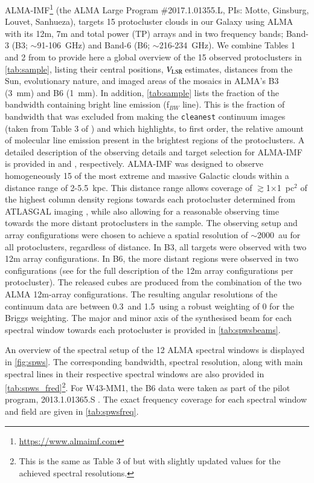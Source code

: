 \documentclass[longauth]{aa} %
\newcommand{\vlsr}{\mbox{$V_{\rm LSR}$\,}}
\begin{document}
\label{sec:observations}
ALMA-IMF\footnote{\url{https://www.almaimf.com}} (the ALMA Large Program \#2017.1.01355.L, PIs: Motte, Ginsburg, Louvet, Sanhueza), targets 15 protocluster clouds in our Galaxy using ALMA with its 12m, 7m and total power (TP) arrays and in two frequency bands; Band-3 (B3; $\sim$91-106~GHz) and Band-6 (B6; $\sim$216-234~GHz).
 We combine Tables 1 and 2 from \citet{Motte2022} to provide here a global overview of the 15 observed protoclusters in \cref{tab:sample}, listing their central positions, \vlsr estimates, distances from the Sun, evolutionary nature, and imaged areas of the mosaics in ALMA's B3 (3~mm) and B6 (1~mm). In addition, \cref{tab:sample} lists the fraction of the bandwidth containing bright line emission (f$_{BW}$ line). This is the fraction of bandwidth that was excluded from making the \texttt{cleanest} continuum images (taken from Table 3 of \citealt{Ginsburg2022}) and which highlights, to first order, the relative amount of molecular line emission present in the brightest regions of the protoclusters. A detailed description of the observing details and target selection for ALMA-IMF is provided in \citet{Ginsburg2022} and \citet{Motte2022}, respectively. ALMA-IMF was designed to observe homogeneously 15 of the most extreme and massive Galactic clouds within a distance range of 2-5.5~kpc. This distance range allows coverage of $\gtrsim$1$\times$1~pc$^2$ of the highest column density regions towards each protocluster determined from ATLASGAL imaging \citep{csengeri17b}, while also allowing for a reasonable observing time towards the more distant protoclusters in the sample. The observing setup and array configurations were chosen to achieve a spatial resolution of $\sim$2000~au for all protoclusters, regardless of distance. In B3, all targets were observed with two 12m array configurations. In B6, the more distant regions were observed in two configurations (see \citealt{Ginsburg2022} for the full description of the 12m array configurations per protocluster). The released cubes are produced from the combination of the two ALMA 12m-array configurations. The resulting angular resolutions of the continuum data are between 0.3\arcsec\, and 1.5\arcsec\, using a robust weighting of 0 for the Briggs weighting. The major and minor axis of the synthesised beam for each spectral window towards each protocluster is provided in \cref{tab:spwsbeams}.
  
An overview of the spectral setup of the 12 ALMA spectral windows is displayed in \cref{fig:spws}. The corresponding bandwidth, spectral resolution, along with main spectral lines in their respective spectral windows are also provided in \cref{tab:spws_fred}\footnote{This is the same as Table 3 of \citet{Motte2022} but with slightly updated values for the achieved spectral resolutions.\label{note:newres}}. For W43-MM1, the B6 data were taken as part of the pilot program, 2013.1.01365.S \citep{Motte2018}. The exact frequency coverage for each spectral window and field are given in \cref{tab:spwsfreq}.%
\end{document}
